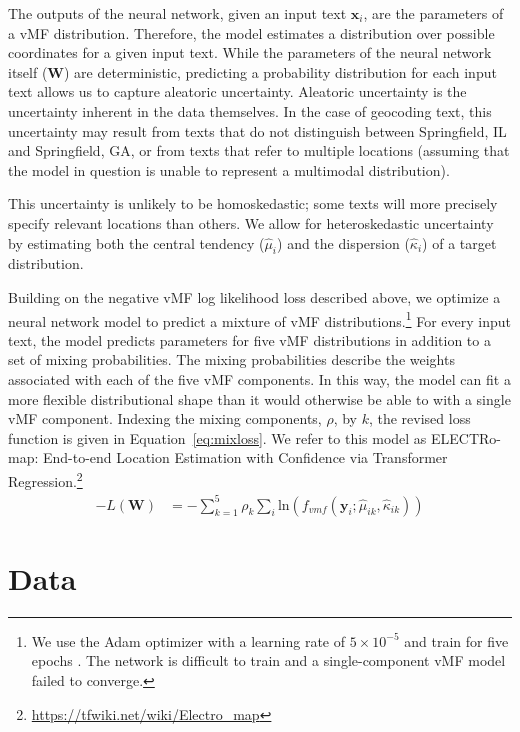 \documentclass[11pt,a4paper]{article}
\begin{document}
The outputs of the neural network, given an input text $\textbf{x}_i$, are the parameters of a vMF distribution. Therefore, the model estimates a distribution over possible coordinates for a given input text. While the parameters of the neural network itself ($\textbf{W}$) are deterministic, predicting a probability distribution for each input text allows us to capture aleatoric uncertainty. Aleatoric uncertainty is the uncertainty inherent in the data themselves. In the case of geocoding text, this uncertainty may result from texts that do not distinguish between Springfield, IL and Springfield, GA, or from texts that refer to multiple locations (assuming that the model in question is unable to represent a multimodal distribution). 

This uncertainty is unlikely to be homoskedastic; some texts will more precisely specify relevant locations than others. We allow for heteroskedastic uncertainty by estimating both the central tendency ($\hat{\mu}_i$) and the dispersion ($\hat{\kappa}_i$) of a target distribution.

Building on the negative vMF log likelihood loss described above, we optimize a neural network model to predict a mixture of vMF distributions.\footnote{We use the Adam optimizer with a learning rate of $5\times10^{-5}$ and train for five epochs \citep{DBLP:journals/corr/KingmaB14}. The network is difficult to train and a single-component vMF model failed to converge.} For every input text, the model predicts parameters for five vMF distributions in addition to a set of mixing probabilities. The mixing probabilities describe the weights associated with each of the five vMF components. In this way, the model can fit a more flexible distributional shape than it would otherwise be able to with a single vMF component. Indexing the mixing components, $\rho$, by $k$, the revised loss function is given in Equation~\ref{eq:mixloss}. We refer to this model as ELECTRo-map: End-to-end Location Estimation with Confidence via Transformer Regression.\footnote{\url{https://tfwiki.net/wiki/Electro_map}}
\begin{align}\label{eq:mixloss}
    -L(\textbf{W}) &= - \sum_{k=1}^{5} \rho_k \sum_{i} \text{ln}(f_{vmf}(\textbf{y}_i;\hat{\mu}_{ik},\hat{\kappa}_{ik}))
\end{align}

\section{Data}
\end{document}
